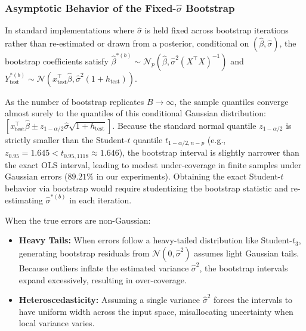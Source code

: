 \documentclass[journal]{IEEEtran}
\begin{document}
\subsubsection{Asymptotic Behavior of the Fixed-$\hat{\sigma}$ Bootstrap}
In standard implementations where $\hat{\sigma}$ is held fixed across bootstrap iterations rather than re-estimated or drawn from a posterior, conditional on $(\hat{\beta}, \hat{\sigma})$, the bootstrap coefficients satisfy $\hat{\beta}^{*(b)} \sim \mathcal{N}_p(\hat{\beta}, \hat{\sigma}^2(X^\top X)^{-1})$ and $Y_{\text{test}}^{*(b)} \sim \mathcal{N}(x_{\text{test}}^\top \hat{\beta}, \hat{\sigma}^2(1 + h_{\text{test}}))$. 

As the number of bootstrap replicates $B \to \infty$, the sample quantiles converge almost surely to the quantiles of this conditional Gaussian distribution: $[x_{\text{test}}^\top \hat{\beta} \pm z_{1-\alpha/2} \hat{\sigma} \sqrt{1 + h_{\text{test}}}]$. Because the standard normal quantile $z_{1-\alpha/2}$ is strictly smaller than the Student-$t$ quantile $t_{1-\alpha/2, n-p}$ (e.g., $z_{0.95} = 1.645 < t_{0.95, 1118} \approx 1.646$), the bootstrap interval is slightly narrower than the exact OLS interval, leading to modest under-coverage in finite samples under Gaussian errors ($89.21\%$ in our experiments). Obtaining the exact Student-$t$ behavior via bootstrap would require studentizing the bootstrap statistic and re-estimating $\hat{\sigma}^{*(b)}$ in each iteration.

When the true errors are non-Gaussian:
\begin{itemize}
    \item \textbf{Heavy Tails:} When errors follow a heavy-tailed distribution like Student-$t_3$, generating bootstrap residuals from $\mathcal{N}(0, \hat{\sigma}^2)$ assumes light Gaussian tails. Because outliers inflate the estimated variance $\hat{\sigma}^2$, the bootstrap intervals expand excessively, resulting in over-coverage.
    \item \textbf{Heteroscedasticity:} Assuming a single variance $\hat{\sigma}^2$ forces the intervals to have uniform width across the input space, misallocating uncertainty when local variance varies.
\end{itemize}
\end{document}
